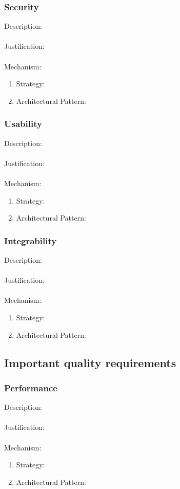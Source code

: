 \documentclass[a4paper,12pt,titlepage]{article}
\begin{document}
\subsubsection{Security}%
	Description: \\\\
	Justification: \\\\
	Mechanism:
	\begin{enumerate}
		\item Strategy: 
		\item Architectural Pattern:
	\end{enumerate}
\subsubsection{Usability}%
	Description: \\\\
	Justification: \\\\
	Mechanism:
	\begin{enumerate}
		\item Strategy: 
		\item Architectural Pattern:
	\end{enumerate}
\subsubsection{Integrability}%
	Description: \\\\
	Justification: \\\\
	Mechanism:
	\begin{enumerate}
		\item Strategy: 
		\item Architectural Pattern:
	\end{enumerate}
\newpage
\subsection{Important quality requirements}
\subsubsection{Performance}%
	Description: \\\\
	Justification: \\\\
	Mechanism:
	\begin{enumerate}
		\item Strategy: 
		\item Architectural Pattern:
	\end{enumerate}
\end{document}
